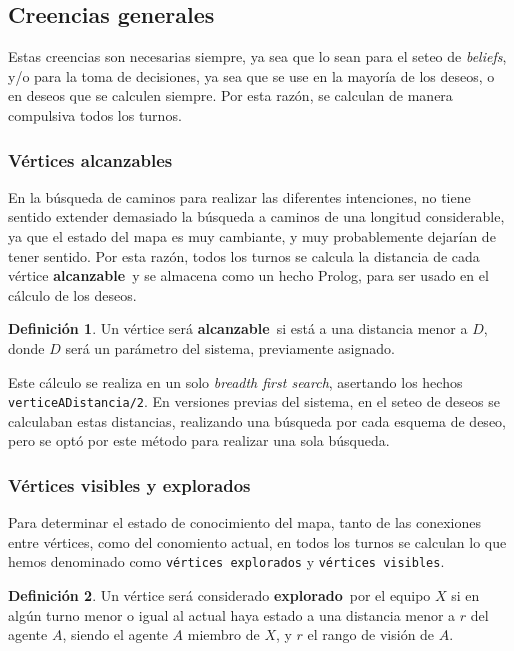 \documentclass[oneside]{book}
\theoremstyle{definition}
\newtheorem{definicion}{Definición}[section]
\theoremstyle{example}
\begin{document}
\subsection{Creencias generales}

\label{sec:creenciasGenerales}

Estas creencias son necesarias siempre, ya sea que lo sean para el seteo de 
\textit{beliefs}, y/o para la toma de decisiones, ya sea que se use en la mayoría
de los deseos, o en deseos que se calculen siempre. Por esta razón, se calculan
de manera compulsiva todos los turnos.


\subsubsection{Vértices alcanzables}

En la búsqueda de caminos para realizar las diferentes intenciones, no tiene sentido
extender demasiado la búsqueda a caminos de una longitud considerable, ya que el 
estado del mapa es muy cambiante, y muy probablemente dejarían de tener sentido. Por
esta razón, todos los turnos se calcula la distancia de cada vértice 
\textbf{alcanzable}\ y se almacena como un hecho Prolog, para ser usado en el 
cálculo de los deseos.

\begin{definicion}
Un vértice será \textbf{alcanzable}\ si está a una distancia menor a $D$, donde $D$
será un parámetro del sistema, previamente asignado.
\end{definicion}

Este cálculo se realiza en un solo \textit{breadth first search}, asertando los hechos
\texttt{verticeADistancia/2}. En versiones previas del sistema, en el seteo de deseos
se calculaban estas distancias, realizando una búsqueda por cada esquema de deseo, 
pero se optó por este método para realizar una sola búsqueda.


\subsubsection{Vértices visibles y explorados}

Para determinar el estado de conocimiento del mapa, tanto de las conexiones
entre vértices, como del conomiento actual, en todos los turnos se calculan
lo que hemos denominado como \texttt{vértices explorados} y \texttt{vértices 
visibles}. 

\begin{definicion}
Un vértice será considerado \textbf{explorado}\ por el equipo $X$ si en algún 
turno menor o igual al actual haya estado a una distancia menor a $r$ del agente
$A$, siendo el agente $A$ miembro de $X$, y $r$ el rango de visión de $A$.
\end{definicion}
\end{document}
